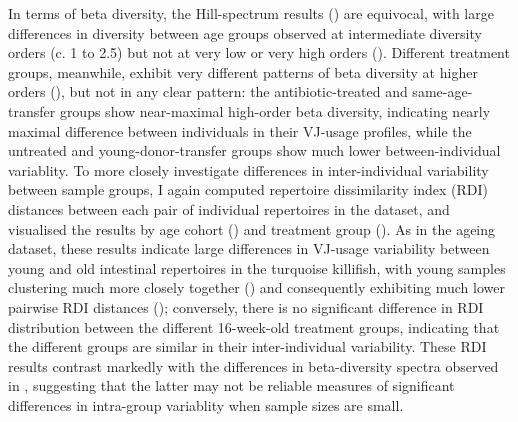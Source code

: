In terms of beta diversity, the Hill-spectrum results () are equivocal, with large differences in diversity between age groups observed at intermediate diversity orders (c. 1 to 2.5) but not at very low or very high orders (). Different treatment groups, meanwhile, exhibit very different patterns of beta diversity at higher orders (), but not in any clear pattern: the antibiotic-treated and same-age-transfer groups show near-maximal high-order beta diversity, indicating nearly maximal difference between individuals in their VJ-usage profiles, while the untreated and young-donor-transfer groups show much lower between-individual variablity. To more closely investigate differences in inter-individual variability between sample groups, I again computed repertoire dissimilarity index (RDI) distances between each pair of individual repertoires in the dataset, and visualised the results by age cohort () and treatment group (). As in the ageing dataset, these results indicate large differences in VJ-usage variability between young and old intestinal repertoires in the turquoise killifish, with young samples clustering much more closely together () and consequently exhibiting much lower pairwise RDI distances (); conversely, there is no significant difference in RDI distribution between the different 16-week-old treatment groups, indicating that the different groups are similar in their inter-individual variability. These RDI results contrast markedly with the differences in beta-diversity spectra observed in , suggesting that the latter may not be reliable measures of significant differences in intra-group variablity when sample sizes are small.


